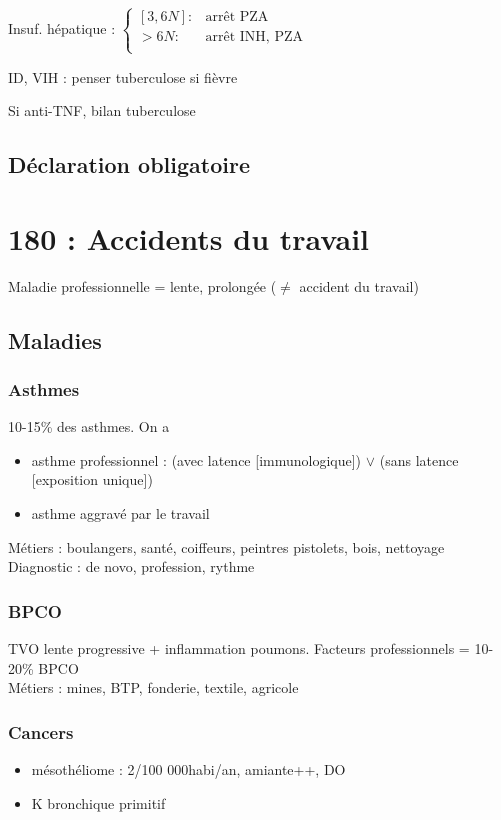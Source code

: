 \documentclass{article}
\begin{document}
Insuf. hépatique :
  $\begin{cases}
  [3,6N] : & \text{arrêt PZA}\\
  > 6N : & \text{arrêt INH, PZA}\\
\end{cases}$

ID, VIH : penser tuberculose si fièvre

Si anti-TNF, bilan tuberculose
\subsection{Déclaration obligatoire}

\section{180 : Accidents du travail}
Maladie professionnelle = lente, prolongée (\(\neq\) accident du travail)
\subsection{Maladies}
\subsubsection{Asthmes}
10-15\% des asthmes. On a
\begin{itemize}
\item asthme professionnel : (avec latence [immunologique]) \(\vee\) (sans latence
  [exposition unique])
\item asthme aggravé par le travail
\end{itemize}
Métiers : boulangers, santé, coiffeurs, peintres pistolets, bois, nettoyage\\
Diagnostic : de novo, profession, rythme
\subsubsection{BPCO}
\gls{TVO} lente progressive + inflammation
poumons. Facteurs professionnels = 10-20\% BPCO\\
Métiers : mines, BTP, fonderie, textile, agricole
\subsubsection{Cancers}
\begin{itemize}
\item mésothéliome : 2/100 000habi/an, amiante++, DO
\item K bronchique primitif
\end{itemize}
\end{document}
